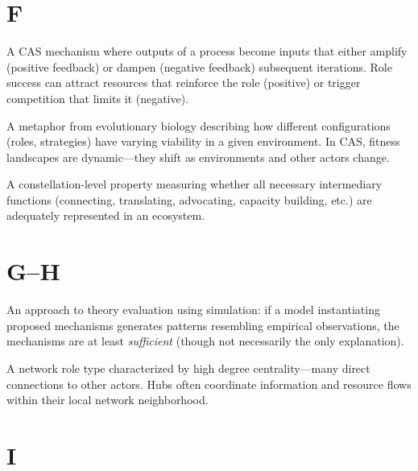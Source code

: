 \documentclass[../main.tex]{subfiles}
\begin{document}
\section*{F}

\begin{description}[leftmargin=0.5cm, style=nextline]

\item[Feedback Loop] A CAS mechanism where outputs of a process become inputs that either amplify (positive feedback) or dampen (negative feedback) subsequent iterations. Role success can attract resources that reinforce the role (positive) or trigger competition that limits it (negative).

\item[Fitness Landscape] A metaphor from evolutionary biology describing how different configurations (roles, strategies) have varying viability in a given environment. In CAS, fitness landscapes are dynamic---they shift as environments and other actors change.

\item[Functional Coverage] A constellation-level property measuring whether all necessary intermediary functions (connecting, translating, advocating, capacity building, etc.) are adequately represented in an ecosystem.

\end{description}

\section*{G--H}

\begin{description}[leftmargin=0.5cm, style=nextline]

\item[Generative Testing] An approach to theory evaluation using simulation: if a model instantiating proposed mechanisms generates patterns resembling empirical observations, the mechanisms are at least \textit{sufficient} (though not necessarily the only explanation).

\item[Hub] A network role type characterized by high degree centrality---many direct connections to other actors. Hubs often coordinate information and resource flows within their local network neighborhood.

\end{description}

\section*{I}
\end{document}
